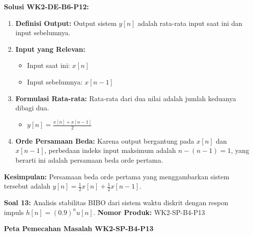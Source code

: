 \documentclass[
  letterpaper,
  DIV=11,
  numbers=noendperiod]{scrreprt}
\providecommand{\tightlist}{%
  \setlength{\itemsep}{0pt}\setlength{\parskip}{0pt}}
\begin{document}
\textbf{Solusi WK2-DE-B6-P12:}

\begin{enumerate}
\def\labelenumi{\arabic{enumi}.}
\tightlist
\item
  \textbf{Definisi Output:} Output sistem \(y[n]\) adalah rata-rata
  input saat ini dan input sebelumnya.
\item
  \textbf{Input yang Relevan:}

  \begin{itemize}
  \tightlist
  \item
    Input saat ini: \(x[n]\)
  \item
    Input sebelumnya: \(x[n-1]\)
  \end{itemize}
\item
  \textbf{Formulasi Rata-rata:} Rata-rata dari dua nilai adalah jumlah
  keduanya dibagi dua.

  \begin{itemize}
  \tightlist
  \item
    \(y[n] = \frac{x[n] + x[n-1]}{2}\)
  \end{itemize}
\item
  \textbf{Orde Persamaan Beda:} Karena output bergantung pada \(x[n]\)
  dan \(x[n-1]\), perbedaan indeks input maksimum adalah
  \(n - (n-1) = 1\), yang berarti ini adalah persamaan beda orde
  pertama.
\end{enumerate}

\textbf{Kesimpulan:} Persamaan beda orde pertama yang menggambarkan
sistem tersebut adalah
\textbf{\(y[n] = \frac{1}{2} x[n] + \frac{1}{2} x[n-1]\)}.

\textbf{Soal 13:} Analisis stabilitas BIBO dari sistem waktu diskrit
dengan respon impuls \(h[n] = (0.9)^n u[n]\). \textbf{Nomor Produk:}
WK2-SP-B4-P13

\textbf{Peta Pemecahan Masalah WK2-SP-B4-P13}
\end{document}
